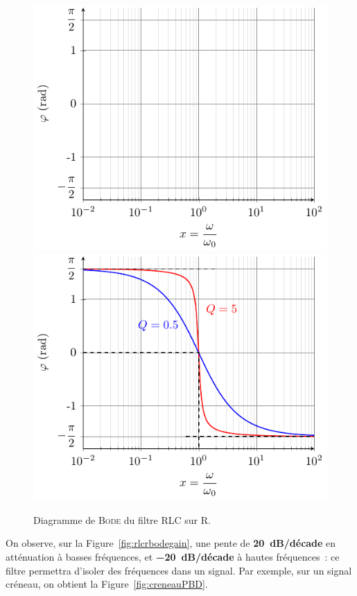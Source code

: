 \documentclass[../../main/main.tex]{subfiles}
\begin{document}
\begin{figure}[htbp!]
{{			\includegraphics[width=.95\linewidth]{RLCR_bode-phase_plain}
		}{
			\includegraphics[width=.95\linewidth]{RLCR_bode-phase}
		}
		\vspace{-15pt}
	}
	\caption{Diagramme de \textsc{Bode} du filtre RLC sur R.}
	\label{fig:rlcrbode}
\end{figure}
On observe, sur la Figure~\ref{fig:rlcrbodegain}, une pente de
\textbf{\SI{20}{dB/décade}} en atténuation à basses fréquences, et
\textbf{\SI{-20}{dB/décade}} à hautes fréquences~: ce filtre permettra d'isoler
des fréquences dans un signal. Par exemple, sur un signal créneau, on obtient la
Figure~\ref{fig:creneauPBD}.
\end{document}
